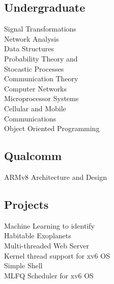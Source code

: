 \documentclass[letterpaper]{deedy-resume} %
\begin{document}
\begin{minipage}[t]{0.23\textwidth}
\subsection{Undergraduate}
\textbullet{} Signal Transformations \\
\textbullet{} Network Analysis \\
\textbullet{} Data Structures \\
\textbullet{} Probability Theory and \\ \hphantom{\textbullet{}} Stocastic Processes \\
\textbullet{} Communication Theory \\
\textbullet{} Computer Networks \\
\textbullet{} Microprocessor Systems \\
\textbullet{} Cellular and Mobile \\ \hphantom{\textbullet{}} Communications \\
\textbullet{} Object Oriented Programming\\

\subsection{Qualcomm}
\textbullet{} ARMv8 Architecture and Design \\

\subsection{Projects}
\footnotesize{\textbullet{} Machine Learning to identify \\ \hphantom{\textbullet{}} Habitable Exoplanets}\\
\footnotesize{\textbullet{} Multi-threaded Web Server}\\
\footnotesize{\textbullet{} Kernel thread support for xv6 OS}\\
\footnotesize{\textbullet{} Simple Shell} \\
\footnotesize{\textbullet{} MLFQ Scheduler for xv6 OS} \\

\hfill
\end{minipage} %
%
%
\end{document}
